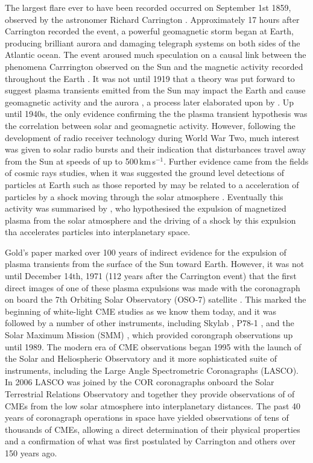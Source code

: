 The largest flare ever to have been recorded occurred on September 1st 1859, observed by the astronomer Richard Carrington \citep{carrington1859}. Approximately 17 hours after Carrington recorded the event, a powerful geomagnetic storm began at Earth, producing brilliant aurora and damaging telegraph systems on both sides of the Atlantic ocean. The event aroused much speculation on a causal link between the phenomena Carrrington observed on the Sun and the magnetic activity recorded throughout the Earth \citep{balfour1861}. It was not until 1919 that a theory was put forward to suggest plasma transients emitted from the Sun may impact the Earth and cause geomagnetic activity and the aurora \citet{lindemann1919}, a process later elaborated upon by \citet{chapman1930}. Up until 1940s, the only evidence confirming the the plasma transient hypothesis was the correlation between solar and geomagnetic activity. However, following the development of radio receiver technology during World War Two, much interest was given to solar radio bursts and their indication that disturbances travel away from the Sun at speeds of up to 500\,km\,s$^{-1}$\citep{wild1958}. Further evidence came from the fields of cosmic rays studies, when it was suggested the ground level detections of particles at Earth such as those reported by \citep{forbush1946} may be related to a acceleration of particles by a shock moving through the solar atmosphere \citep{wild1963}. Eventually this activity was summarised by \citet{gold1962}, who hypothesised the expulsion of magnetized plasma from the solar atmosphere and the driving of a shock by this expulsion tha accelerates particles into interplanetary space. 

Gold's paper marked over 100 years of indirect evidence for the expulsion of plasma transients from the surface of the Sun toward Earth. However, it was not until December 14th, 1971 (112 years after the Carrington event) that the first direct images of one of these plasma expulsions was made with the coronagraph on board the 7th Orbiting Solar Observatory (OSO-7) satellite \citep{tousey1971}. This marked the beginning of white-light CME studies as we know them today, and it was followed by a number of other instruments, including Skylab \citep{macqueen1980}, P78-1 \citep{sheeley1980}, and the Solar Maximum Mission (SMM) \citep{hundhausen1999}, which provided corongraph observations up until 1989. The modern era of CME observations began 1995 with the launch of the Solar and Heliospheric Observatory \citep[\emph{SOHO};][]{dom95} and it more sophisticated suite of instruments, including the Large Angle Spectrometric Coronagraphs (LASCO). In 2006 LASCO was joined by the COR coronagraphs onboard the Solar Terrestrial Relations Observatory \citep[\emph{STEREO};][]{kai08} and together they provide observations of of CMEs from the low solar atmosphere into interplanetary distances. The past 40 years of coronagraph operations in space have yielded observations of tens of thousands of CMEs, allowing a direct determination of their physical properties and a confirmation of what was first postulated by Carrington and others over 150 years ago.

